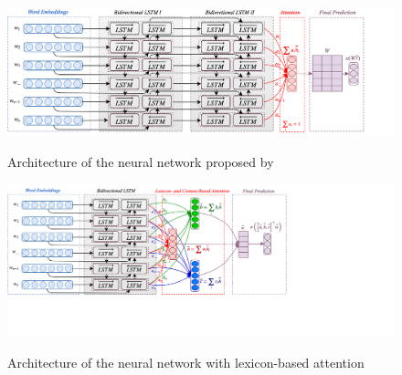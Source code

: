 
\begin{figure}[htbp!]
{
  \centering
  \includegraphics[width=\linewidth]{img/baziotis.png}
}
\caption[Neural network of \citet{Baziotis:17}]{Architecture of the
  neural network proposed
  by~\citet{Baziotis:17}}\label{cgsa:fig:baziotis}
\end{figure}


\begin{figure}[htbp!]
{
  \centering
  \includegraphics[width=1.3\linewidth]{img/lba.png}
}
\caption[Neural network with lexicon-based attention]{Architecture of the
  neural network with lexicon-based attention}\label{cgsa:fig:lba}
\end{figure}



